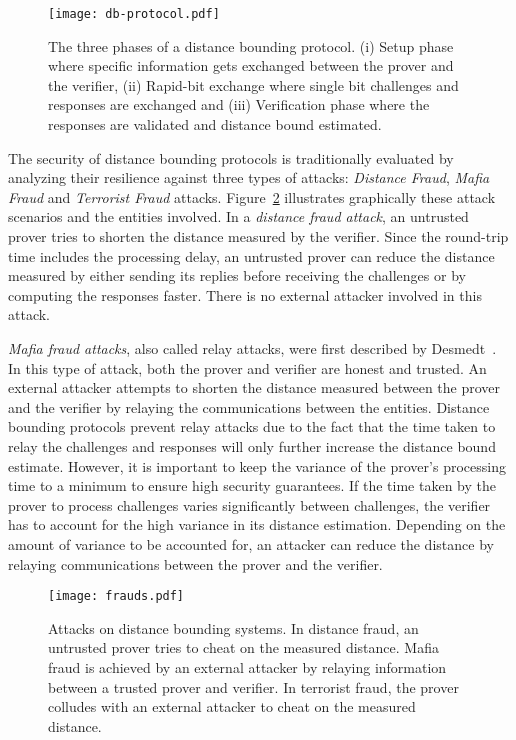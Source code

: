 \documentclass{sig-alternate-10pt}
\begin{document}
\begin{figure}[t]
  \centering
  \texttt{[image: db-protocol.pdf]}
  \caption{The three phases of a distance bounding protocol. (i) Setup phase
    where specific information gets exchanged between the prover and the
    verifier, (ii) Rapid-bit exchange where single bit challenges and responses
    are exchanged and (iii) Verification phase where the responses are
    validated and distance bound estimated.}
  \label{fig:db-protocol}
\end{figure}


The security of distance bounding protocols is traditionally evaluated by
analyzing their resilience against three types of attacks: \emph{Distance
  Fraud}, \emph{Mafia Fraud} and \emph{Terrorist Fraud} attacks.
Figure~\ref{fig:frauds} illustrates graphically these attack scenarios and the
entities involved. In a \emph{distance fraud attack}, an untrusted prover tries
to shorten the distance measured by the verifier. Since the round-trip time
includes the processing delay, an untrusted prover can reduce the distance
measured by either sending its replies before receiving the challenges or by
computing the responses faster. There is no external attacker involved in this
attack.

\emph{Mafia fraud attacks}, also called relay attacks, were first described by
Desmedt~\cite{DesmedtAug87}. In this type of attack, both the prover and
verifier are honest and trusted. An external attacker attempts to shorten the
distance measured between the prover and the verifier by relaying the
communications between the entities. Distance bounding protocols prevent relay
attacks due to the fact that the time taken to relay the challenges and
responses will only further increase the distance bound estimate. However, it is
important to keep the variance of the prover's processing time to a minimum to
ensure high security guarantees. If the time taken by the prover to process
challenges varies significantly between challenges, the verifier has to account
for the high variance in its distance estimation. Depending on the amount of
variance to be accounted for, an attacker can reduce the distance by relaying
communications between the prover and the verifier.

\begin{figure}[t]
  \centering
  \texttt{[image: frauds.pdf]}
  \caption{Attacks on distance bounding systems. In distance fraud, an untrusted
    prover tries to cheat on the measured distance. Mafia fraud is achieved by
    an external attacker by relaying information between a trusted prover and
    verifier. In terrorist fraud, the prover colludes with an external attacker
    to cheat on the measured distance.}
  \label{fig:frauds}
\end{figure}
\end{document}
